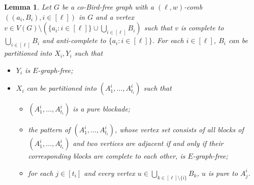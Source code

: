 \documentclass[10pt,a4paper]{amsart}
\newtheorem{lemma}{Lemma}
\begin{document}
    \begin{lemma}\label{lem:coro-lem}
        Let $G$ be a co-Bird-free graph with a $(\ell,w)$-comb $((a_i,B_i),i\in[\ell])$ in $G$ and a vertex $v\in V(G)\setminus(\{a_i:i\in[\ell]\}\cup\bigcup_{i\in[\ell]}B_i)$ such that $v$ is complete to $\bigcup_{i\in[\ell]}B_i$ and anti-complete to $\{a_i:i\in[\ell]\}$. 
        For each $i\in[\ell]$, $B_i$ can be partitioned into $X_i,Y_i$ such that 
        \begin{itemize}
            \item[$(1)$] $Y_i$ is $E$-graph-free;  
            \item[$(2)$] $X_i$ can be partitioned into $(A^i_1,\ldots, A^i_{t_i})$ such that 
            \begin{itemize}
                \item[$(2.1)$] $(A^i_1,\ldots, A^i_{t_i})$ is a pure blockade; 
                \item[$(2.2)$] the pattern of $(A^i_1,\ldots, A^i_{t_i})$, whose vertex set consists of all blocks of $(A^i_1,\ldots, A^i_{t_i})$ and two vertices are adjacent if and only if their corresponding blocks are complete to each other, is $E$-graph-free; 
                \item[$(2.3)$] for each $j\in [t_i]$ and every vertex $u\in \bigcup_{k\in [\ell]\setminus \{i\}} B_k$, $u$ is pure to $A^i_j$.
            \end{itemize}
        \end{itemize} 
    \end{lemma}
\end{document}
